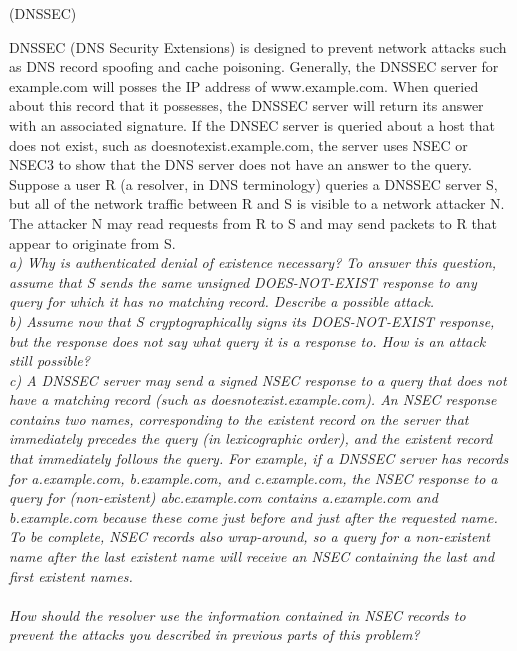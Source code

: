 \begin{prob}  (DNSSEC) 
\end{prob}

\noindent DNSSEC (DNS Security Extensions) is designed to prevent network attacks such as DNS record spoofing and cache poisoning. Generally, the DNSSEC server for example.com will posses the IP address of www.example.com. When queried about this record that it possesses, the DNSSEC server will return its answer with an associated signature. If the DNSEC server is queried about a host that does not exist, such as doesnotexist.example.com, the server uses NSEC or NSEC3 to show that the DNS server does not have an answer to the query.\\
\indent Suppose a user R (a resolver, in DNS terminology) queries a DNSSEC server S, but all of the network traffic between R and S is visible to a network attacker N. The attacker N may read requests from R to S and may send packets to R that appear to originate from S.\\

\noindent \textit{a) Why is authenticated denial of existence necessary? To answer this question, assume that S sends the same unsigned DOES-NOT-EXIST response to any query for which it has no matching record. Describe a possible attack.}\\

\noindent \textit{b) Assume now that S cryptographically signs its DOES-NOT-EXIST response, but the response does not say what query it is a response to. How is an attack still possible?}\\

\noindent \textit{c) A DNSSEC server may send a signed NSEC response to a query that does not have a matching record (such as doesnotexist.example.com). An NSEC response contains two names, corresponding to the existent record on the server that immediately precedes the query (in lexicographic order), and the existent record that immediately follows the query. For example, if a DNSSEC server has records for a.example.com, b.example.com, and c.example.com, the NSEC response to a query for (non-existent) abc.example.com contains a.example.com and b.example.com because these come just before and just after the requested name. To be complete, NSEC records also wrap-around, so a query for a non-existent name after the last existent name will receive an NSEC containing the last and first existent names.\\\\
How should the resolver use the information contained in NSEC records to prevent the attacks you described in previous parts of this problem?}\\

